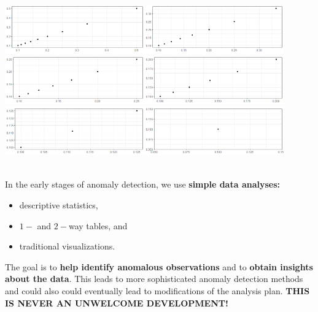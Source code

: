 \documentclass[20pt,landscape,footrule,headrule]{foils}
\newcommand{\newl}{\newline\newline}
\begin{document}
\begin{center}
\includegraphics[width=0.45\textwidth]{Images/ADOA1.png}\quad\includegraphics[width=0.45\textwidth]{Images/ADOA2.png} \bigskip
\includegraphics[width=0.45\textwidth]{Images/ADOA3.png}\quad\includegraphics[width=0.45\textwidth]{Images/ADOA4.png} \bigskip
\includegraphics[width=0.45\textwidth]{Images/ADOAn.png}\quad\includegraphics[width=0.45\textwidth]{Images/ADOA10.png}\end{center}

\newpage\ \\ \noindent In the early stages of anomaly detection, we use \textbf{simple data analyses:}
\begin{itemize}
\item descriptive statistics, 
\item $1-$ and $2-$way tables, and  
\item traditional  visualizations.
\end{itemize}
The goal is to \textbf{help identify anomalous observations} and to \textbf{obtain insights about the data}.
\newl 
This leads to more sophisticated anomaly detection methods and could also could eventually lead to modifications of the analysis plan. 
\newl \textbf{THIS IS NEVER AN UNWELCOME DEVELOPMENT!}
\end{document}
